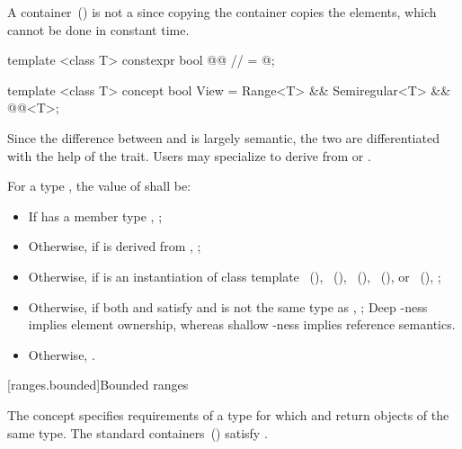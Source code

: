 A container~() is not a  since copying the
container copies the elements, which cannot be done in constant time.
\exitexample

\begin{itemdecl}
template <class T>
constexpr bool @@ // \expos
  = @\seebelow@;

template <class T>
concept bool View =
  Range<T> &&
  Semiregular<T> &&
  @@<T>;
\end{itemdecl}

\begin{itemdescr}
\pnum
Since the difference between  and  is largely semantic, the
two are differentiated with the help of the 
trait. Users may specialize 
to derive from  or .

\pnum
For a type , the value of  shall be:
\begin{itemize}
\item If  has a member type , ;
\item Otherwise, if  is derived from , ;
\item Otherwise, if  is an instantiation of class template
~(),
~(),
~(),
~(), or
~(), ;
\item Otherwise, if both  and  satisfy  and
 is not the same type as ,
; \enternote Deep -ness implies element ownership, whereas shallow -ness
implies reference semantics. \exitnote
\item Otherwise, .
\end{itemize}
\end{itemdescr}

[ranges.bounded]{Bounded ranges}

\pnum
The  concept specifies requirements
of a  type for which  and  return objects of
the same type. \enternote The standard containers~()
satisfy .\exitnote

